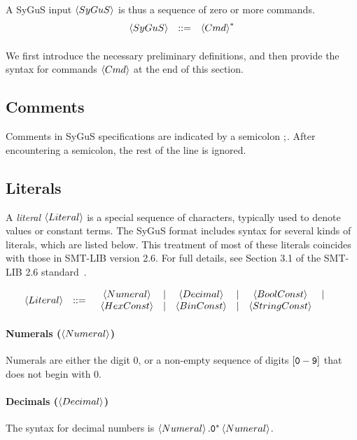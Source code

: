 \documentclass[english,a4paper,10pt]{article}
\begin{document}
A SyGuS input $\left\langle SyGuS\right\rangle$ is thus a sequence of zero or more commands.
\[
\begin{array}{rcl}
\left\langle SyGuS\right\rangle & ::= & \left\langle Cmd\right\rangle^{*}\\[2ex]
\end{array}
\]
We first introduce the necessary preliminary definitions,
and then provide the syntax for commands $\left\langle Cmd\right\rangle$ at the end of this section.

\subsection{Comments}

Comments in SyGuS specifications are indicated by a semicolon ${\tt ;}$.
After encountering a semicolon, the rest of the line is ignored.

\subsection{Literals}
\label{ssec:literals}

A \emph{literal} $\left\langle Literal\right\rangle$ is a special sequence of characters,
typically used to denote values or constant terms.
The SyGuS format includes syntax for several kinds of literals,
which are listed below.
This treatment of most of these literals coincides with
those in SMT-LIB version 2.6.
For full details, see Section 3.1 of the SMT-LIB 2.6 standard~\cite{BarFT-RR-17}.

\begin{alignat*}{1}
 & \begin{array}{rcl}
\left\langle Literal\right\rangle & ::= & \begin{array}{ccccccccccc}
\left\langle Numeral\right\rangle & | & \left\langle Decimal\right\rangle & | & \left\langle BoolConst\right\rangle & | \\
\left\langle HexConst\right\rangle & | & \left\langle BinConst\right\rangle & | & \left\langle StringConst\right\rangle\end{array}\\
\end{array}
\end{alignat*}

\paragraph{Numerals ($\left\langle Numeral\right\rangle$)}
Numerals are
either the digit $0$,
or a non-empty sequence of digits $\left[{\tt 0}-{\tt 9}\right]$
that does not begin with $0$.

\paragraph{Decimals ($\left\langle Decimal\right\rangle$)}
The syntax for decimal numbers is $\left\langle Numeral\right\rangle{\tt .0^{*}}\left\langle Numeral\right\rangle$.
\end{document}
